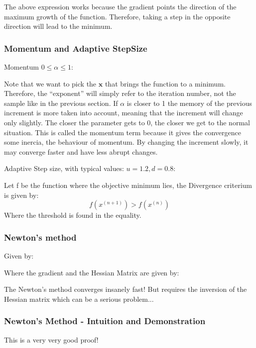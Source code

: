 The above expression works because the gradient points the direction of the maximum growth of the function. Therefore, taking a step in the opposite direction will lead to the minimum.

\subsubsection*{Momentum and Adaptive StepSize}
Momentum $0 \leq \alpha \leq 1$:


Note that we want to pick the $\mathbf{x}$ that brings the function to a minimum. Therefore, the ``exponent'' will simply refer to the iteration number, not the sample like in the previous section.
If $\alpha$ is closer to 1 the memory of the previous increment is more taken into account, meaning that the increment will change only slightly. The closer the parameter gets to 0, the closer we get to the normal situation. This is called the momentum term because it gives the convergence some inercia, the behaviour of momentum. By changing the increment slowly, it may converge faster and have less abrupt changes.


Adaptive Step size, with typical values: $u = 1.2, d = 0.8$:


Let f be the function where the objective minimum lies, the Divergence criterium is given by:
\begin{equation}
    f(x^{(n+1)}) > f(x^{(n)})
\end{equation}
Where the threshold is found in the equality.

\subsubsection*{Newton's method}

Given by:


Where the gradient and the Hessian Matrix are given by:


The Newton's method converges insanely fast! But requires the inversion of the Hessian matrix which can be a serious problem...


\subsubsection{Newton's Method - Intuition and Demonstration}
This is a very very good proof!

